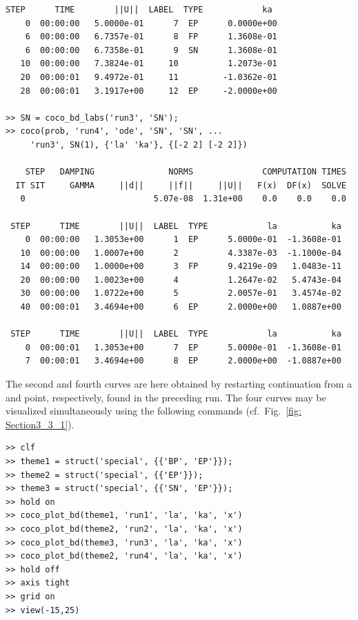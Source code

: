 \begin{lstlisting}[language=coco-highlight,frame=lines]
 STEP      TIME        ||U||  LABEL  TYPE            ka
    0  00:00:00   5.0000e-01      7  EP      0.0000e+00
    6  00:00:00   6.7357e-01      8  FP      1.3608e-01
    6  00:00:00   6.7358e-01      9  SN      1.3608e-01
   10  00:00:00   7.3824e-01     10          1.2073e-01
   20  00:00:01   9.4972e-01     11         -1.0362e-01
   28  00:00:01   3.1917e+00     12  EP     -2.0000e+00

>> SN = coco_bd_labs('run3', 'SN');
>> coco(prob, 'run4', 'ode', 'SN', 'SN', ...
     'run3', SN(1), {'la' 'ka'}, {[-2 2] [-2 2]})

    STEP   DAMPING               NORMS              COMPUTATION TIMES
  IT SIT     GAMMA     ||d||     ||f||     ||U||   F(x)  DF(x)  SOLVE
   0                          5.07e-08  1.31e+00    0.0    0.0    0.0

 STEP      TIME        ||U||  LABEL  TYPE            la           ka
    0  00:00:00   1.3053e+00      1  EP      5.0000e-01  -1.3608e-01
   10  00:00:00   1.0007e+00      2          4.3387e-03  -1.1000e-04
   14  00:00:00   1.0000e+00      3  FP      9.4219e-09   1.0483e-11
   20  00:00:00   1.0023e+00      4          1.2647e-02   5.4743e-04
   30  00:00:00   1.0722e+00      5          2.0057e-01   3.4574e-02
   40  00:00:01   3.4694e+00      6  EP      2.0000e+00   1.0887e+00

 STEP      TIME        ||U||  LABEL  TYPE            la           ka
    0  00:00:01   1.3053e+00      7  EP      5.0000e-01  -1.3608e-01
    7  00:00:01   3.4694e+00      8  EP      2.0000e+00  -1.0887e+00
\end{lstlisting}
The second and fourth curves are here obtained by restarting continuation from a  and  point, respectively, found in the preceding run. The four curves may be visualized simultaneously using the following commands (cf.\ Fig.~\ref{fig: Section3_3_1}).
\begin{lstlisting}[language=coco-highlight,frame=lines]
>> clf
>> theme1 = struct('special', {{'BP', 'EP'}});
>> theme2 = struct('special', {{'EP'}});
>> theme3 = struct('special', {{'SN', 'EP'}});
>> hold on
>> coco_plot_bd(theme1, 'run1', 'la', 'ka', 'x')
>> coco_plot_bd(theme2, 'run2', 'la', 'ka', 'x')
>> coco_plot_bd(theme3, 'run3', 'la', 'ka', 'x')
>> coco_plot_bd(theme2, 'run4', 'la', 'ka', 'x')
>> hold off
>> axis tight
>> grid on
>> view(-15,25)
\end{lstlisting}
